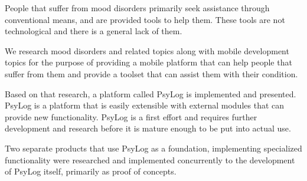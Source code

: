 People that suffer from mood disorders primarily seek assistance through conventional means, and are provided tools to help them.
These tools are not technological and there is a general lack of them.

We research mood disorders and related topics along with mobile development topics for the purpose of providing a mobile platform that can help people that suffer from them and provide a toolset that can assist them with their condition.

Based on that research, a platform called PsyLog is implemented and presented.
PsyLog is a platform that is easily extensible with external modules that can provide new functionality.
PsyLog is a first effort and requires further development and research before it is mature enough to be put into actual use.

Two separate products that use PsyLog as a foundation, implementing specialized functionality were researched and implemented concurrently to the development of PsyLog itself, primarily as proof of concepts. 